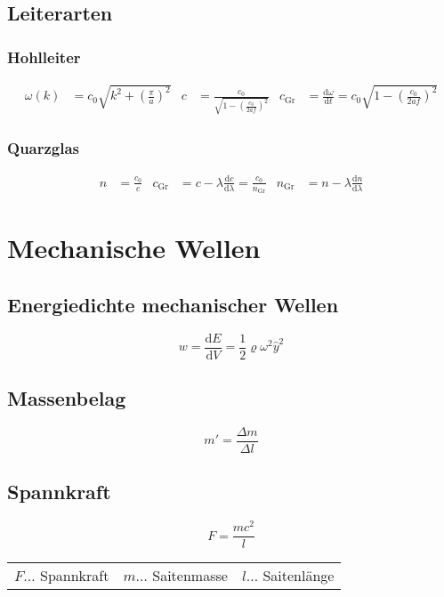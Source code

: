 		\subsection{Leiterarten}
			\subsubsection{Hohlleiter}
				\begin{align*}
					\omega(k)&=c_0\sqrt{k^2+\left(\frac{\pi}{a}\right)^2}
					& c&=\frac{c_0}{\sqrt{1-\left(\frac{c_0}{2af}\right)^2}}
					& c_{\mathrm{Gr}}&=\frac{\mathrm{d}\omega}{\mathrm{d}t}=c_0\sqrt{1-\left(\frac{c_0}{2af}\right)^2}
				\end{align*}

			\subsubsection{Quarzglas}
				\begin{align*}
					n&=\frac{c_0}{c}
					& c_{\mathrm{Gr}}&=c-\lambda\frac{\mathrm{d}c}{\mathrm{d}\lambda}=\frac{c_0}{n_{\mathrm{Gr}}}
					& n_{\mathrm{Gr}}&=n-\lambda\frac{\mathrm{d}n}{\mathrm{d}\lambda}
				\end{align*}

	\section{Mechanische Wellen}
		\subsection{Energiedichte mechanischer Wellen}
			\[
				w = \frac{\mathrm{d}E}{\mathrm{d}V} = \frac12 \varrho \omega^2 \hat{y}^2
			\]
		
		\subsection{Massenbelag}
			\[
				m'=\frac{\Delta m}{\Delta l}
			\]	

		\subsection{Spannkraft}
			\[
				F=\frac{mc^2}{l}
			\]

			\begin{table}[h]
			\begin{tabular}{lll}
			$F\dots$ Spannkraft & $m\dots$ Saitenmasse & $l\dots$ Saitenlänge\\
			\end{tabular}
			\end{table}

